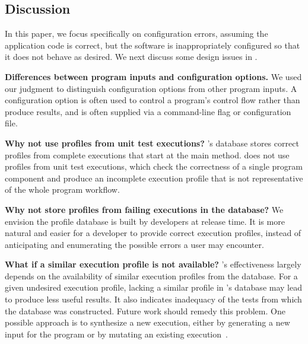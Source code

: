 \subsection{Discussion}

In this paper, we focus specifically on configuration errors,
assuming the application code is correct, but the software		
is inappropriately configured so that it does not		
behave as desired. We next discuss some design issues in \ourtool.

\vspace{1mm}
\noindent \textbf{Differences between program inputs and configuration options.}
We used our judgment to distinguish configuration options 
from other program inputs. A configuration option is
often used to control a program's control flow rather
than produce results, and is often supplied via a command-line
flag or configuration file.



\vspace{1mm}
\noindent \textbf{Why not use profiles from unit test executions?}
\ourtool's database stores correct profiles from complete 
executions that start at the main method.
\ourtool does not use profiles from unit test executions, which check the
correctness
of a single program component and produce
an incomplete execution profile that is not representative of
the whole program workflow. 



\vspace{1mm}
\noindent \textbf{Why not store profiles from failing executions in the database?}
We envision the profile database is built by developers at release time.
It is more natural and easier for a developer to provide correct execution
profiles, instead of anticipating and enumerating the possible
errors a user may encounter.

\vspace{1mm}
\noindent \textbf{What if a similar execution profile is not available?}
\ourtool's effectiveness largely depends on the availability of
similar execution profiles from the database. For a given undesired execution profile, lacking a similar
profile in \ourtool's database may lead \ourtool to produce
less useful results.  It also indicates inadequacy of the tests from
which the database was constructed.
Future work should remedy this problem. One
possible approach is to synthesize a new execution, either by
generating a new input for the program or by mutating an
existing execution~\cite{sumnerICSE2011}.


